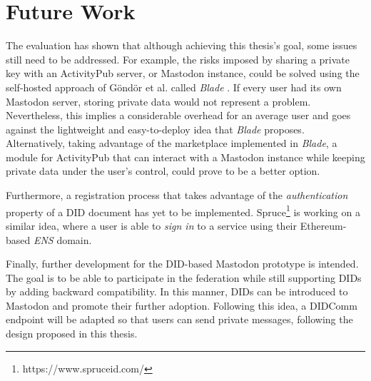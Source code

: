 



\section{Future Work}
The evaluation has shown that although achieving this thesis's goal, some issues still need to be addressed. For example, the risks imposed by sharing a private key with an ActivityPub server, or Mastodon instance, could be solved using the self-hosted approach of Göndör et al. called \emph{Blade} \cite{inproceedings}. If every user had its own Mastodon server, storing private data would not represent a problem. Nevertheless, this implies a considerable overhead for an average user and goes against the lightweight and easy-to-deploy idea that \emph{Blade} proposes. Alternatively, taking advantage of the marketplace implemented in \emph{Blade}, a module for ActivityPub that can interact with a Mastodon instance while keeping private data under the user's control, could prove to be a better option. 

Furthermore, a registration process that takes advantage of the \emph{authentication} property of a DID document has yet to be implemented. Spruce\footnote{https://www.spruceid.com/} is working on a similar idea, where a user is able to \emph{sign in} to a service using their Ethereum-based \emph{ENS} domain. 

Finally, further development for the DID-based Mastodon prototype is intended. The goal is to be able to participate in the federation while still supporting DIDs by adding backward compatibility. In this manner, DIDs can be introduced to Mastodon and promote their further adoption. Following this idea, a DIDComm endpoint will be adapted so that users can send private messages, following the design proposed in this thesis.